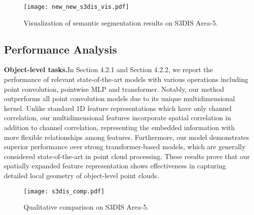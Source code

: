 \documentclass[preprint,12pt]{elsarticle}
\begin{document}
\begin{figure}[!t]
	\begin{center}
\texttt{[image: new\_new\_s3dis\_vis.pdf]}
	\end{center}
	\vspace{-0.7cm}
	\caption{Visualization of semantic segmentation results on S3DIS Area-5.
	}
	\label{fig:s3dis}
\end{figure}




\subsection{Performance Analysis}
\noindent\textbf{Object-level tasks.}\hspace{0.3cm}In Section 4.2.1 and Section 4.2.2, we report the performance of relevant state-of-the-art models with various operations including point convolution, pointwise MLP and transformer. Notably, our method outperforms all point convolution models due to its unique multidimensional kernel. Unlike standard 1D feature representations which have only channel correlation, our multidimensional features incorporate spatial correlation in addition to channel correlation, representing the embedded information with more flexible relationships among features. Furthermore, our model demonstrates superior performance over strong transformer-based models, which are generally considered state-of-the-art in point cloud processing. These results prove that our spatially expanded feature representation shows effectiveness in capturing detailed local geometry of object-level point clouds.

\begin{figure}[t]
	\begin{center}
\texttt{[image: s3dis\_comp.pdf]}
	\end{center}
	\vspace{-0.6cm}
	\caption{Qualitative comparison on S3DIS Area-5.
	}
	\label{fig:s3dis_comp}
	\vspace{-0.6cm}
\end{figure}
\end{document}
